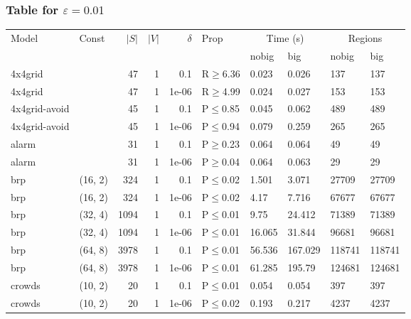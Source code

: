 \subsubsection{Table for \(\varepsilon=0.01\)}
\begin{longtable}{llrrrlllll}

        \toprule
        Model & Const & $|S|$ & $|V|$ & $\delta$ & Prop & \multicolumn{2}{c}{Time (s)} & \multicolumn{2}{c}{Regions} \\
        \cmidrule(ll){7-8} \cmidrule(ll){9-10}
        & & & & & & nobig & big & nobig & big \\
        \midrule
        
 4x4grid       &           &     	47 & 1 & 0.1   & R$\geq$6.36  & 0.023  & 0.026   & 137    & 137    \\
 4x4grid       &           &     	47 & 1 & 1e-06 & R$\geq$4.99  & 0.024  & 0.027   & 153    & 153    \\
 4x4grid-avoid &           &     	45 & 1 & 0.1   & P$\leq$0.85  & 0.045  & 0.062   & 489    & 489    \\
 4x4grid-avoid &           &     	45 & 1 & 1e-06 & P$\leq$0.94  & 0.079  & 0.259   & 265    & 265    \\
 alarm         &           &     	31 & 1 & 0.1   & P$\geq$0.23  & 0.064  & 0.064   & 49     & 49     \\
 alarm         &           &     	31 & 1 & 1e-06 & P$\geq$0.04  & 0.064  & 0.063   & 29     & 29     \\
 brp           & (16, 2)   &    	324 & 1 & 0.1   & P$\leq$0.02  & 1.501  & 3.071   & 27709  & 27709  \\
 brp           & (16, 2)   &    	324 & 1 & 1e-06 & P$\leq$0.02  & 4.17   & 7.716   & 67677  & 67677  \\
 brp           & (32, 4)   &   	1094 & 1 & 0.1   & P$\leq$0.01  & 9.75   & 24.412  & 71389  & 71389  \\
 brp           & (32, 4)   &   	1094 & 1 & 1e-06 & P$\leq$0.01  & 16.065 & 31.844  & 96681  & 96681  \\
 brp           & (64, 8)   &   	3978 & 1 & 0.1   & P$\leq$0.01  & 56.536 & 167.029 & 118741 & 118741 \\
 brp           & (64, 8)   &   	3978 & 1 & 1e-06 & P$\leq$0.01  & 61.285 & 195.79  & 124681 & 124681 \\
 crowds        & (10, 2)   &     	20 & 1 & 0.1   & P$\leq$0.01  & 0.054  & 0.054   & 397    & 397    \\
 crowds        & (10, 2)   &     	20 & 1 & 1e-06 & P$\leq$0.02  & 0.193  & 0.217   & 4237   & 4237   \\

\end{longtable}
